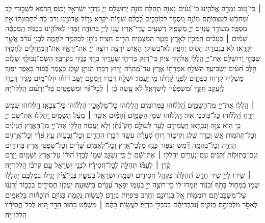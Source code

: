 \documentclass[twoside, openany, parskip=half, 11pt]{book}
\begin{document}
 ׀
כִּי־ט֭וֹב זַמְּרָ֣ה אֱלֹהֵ֑ינוּ כִּי־נָ֝עִ֗ים נָאוָ֥ה תְהִלָּֽה׃
בּוֹנֵ֣ה יְרֽוּשָׁלַ֣‍ִם יְיָ֑ נִדְחֵ֖י יִשְׂרָאֵ֣ל יְכַנֵּֽס׃
הָ֭רֹפֵא לִשְׁב֣וּרֵי לֵ֑ב וּ֝מְחַבֵּ֗שׁ לְעַצְּבוֹתָֽם׃
מוֹנֶ֣ה מִ֭סְפָּר לַכּוֹכָבִ֑ים לְ֝כֻלָּ֗ם שֵׁמ֥וֹת יִקְרָֽא׃
גָּד֣וֹל אֲדוֹנֵ֣ינוּ וְרַב־כֹּ֑חַ לִ֝תְבוּנָת֗וֹ אֵ֣ין מִסְפָּֽר׃
מְעוֹדֵ֣ד עֲנָוִ֣ים יְיָ֑ מַשְׁפִּ֖יל רְשָׁעִ֣ים עֲדֵי־אָֽרֶץ׃
עֱנ֣וּ לַֽייָ֣ בְּתוֹדָ֑ה זַמְּר֖וּ לֵאלֹהֵ֣ינוּ בְכִנּֽוֹר׃
הַֽמְכַסֶּ֬ה שָׁמַ֨יִם ׀ בְּעָבִ֗ים הַמֵּכִ֣ין לָאָ֣רֶץ מָטָ֑ר הַמַּצְמִ֖יחַ הָרִ֣ים חָצִֽיר׃
נוֹתֵ֣ן לִבְהֵמָ֣ה לַחְמָ֑הּ לִבְנֵ֥י עֹ֝רֵ֗ב אֲשֶׁ֣ר יִקְרָֽאוּ׃
לֹ֤א בִגְבוּרַ֣ת הַסּ֣וּס יֶחְפָּ֑ץ לֹא־בְשׁוֹקֵ֖י הָאִ֣ישׁ יִרְצֶֽה׃
רוֹצֶ֣ה יְיָ֭ אֶת־יְרֵאָ֑יו אֶת־הַֽמְיַחֲלִ֥ים לְחַסְדּֽוֹ׃
שַׁבְּחִ֣י יְ֭רוּשָׁלַ‍ִם אֶת־יְיָ֑ הַֽלְלִ֖י אֱלֹהַ֣יִךְ צִיּֽוֹן׃
כִּֽי־חִ֭זַּק בְּרִיחֵ֣י שְׁעָרָ֑יִךְ בֵּרַ֖ךְ בָּנַ֣יִךְ בְּקִרְבֵּֽךְ׃
הַשָּׂם־גְּבוּלֵ֥ךְ שָׁל֑וֹם חֵ֥לֶב חִ֝טִּ֗ים יַשְׂבִּיעֵֽךְ׃
הַשֹּׁלֵ֣חַ אִמְרָת֣וֹ אָ֑רֶץ עַד־מְ֝הֵרָ֗ה יָר֥וּץ דְּבָרֽוֹ׃
הַנֹּתֵ֣ן שֶׁ֣לֶג כַּצָּ֑מֶר כְּ֝פ֗וֹר כָּאֵ֥פֶר יְפַזֵּֽר׃
מַשְׁלִ֣יךְ קַֽרְח֣וֹ כְפִתִּ֑ים לִפְנֵ֥י קָ֝רָת֗וֹ מִ֣י יַעֲמֹֽד׃
יִשְׁלַ֣ח דְּבָר֣וֹ וְיַמְסֵ֑ם יַשֵּׁ֥ב ר֝וּח֗וֹ יִזְּלוּ־מָֽיִם׃
מַגִּ֣יד דְּבָרָ֣ו לְיַעֲקֹ֑ב חֻקָּ֥יו וּ֝מִשְׁפָּטָ֗יו לְיִשְׂרָאֵֽל׃
לֹ֘א עָ֤שָׂה כֵ֨ן ׀ לְכׇל־גּ֗וֹי וּמִשְׁפָּטִ֥ים בַּל־יְדָע֗וּם הַֽלְלוּ־יָֽהּ׃


 ׀
הַֽלְל֣וּ אֶת־יְיָ֭ מִן־הַשָּׁמַ֑יִם הַֽ֝לְל֗וּהוּ בַּמְּרוֹמִֽים׃
הַֽלְל֥וּהוּ כׇל־מַלְאָכָ֑יו הַ֝לְל֗וּהוּ כׇּל־צְבָאָֽו׃
הַֽ֭לְלוּהוּ שֶׁ֣מֶשׁ וְיָרֵ֑חַ הַֽ֝לְל֗וּהוּ כׇּל־כּ֥וֹכְבֵי אֽוֹר׃
הַֽ֭לְלוּהוּ שְׁמֵ֣י הַשָּׁמָ֑יִם וְ֝הַמַּ֗יִם אֲשֶׁ֤ר ׀ מֵעַ֬ל הַשָּׁמָֽיִם׃
יְֽ֭הַלְלוּ אֶת־שֵׁ֣ם יְיָ֑ כִּ֤י ה֖וּא צִוָּ֣ה וְנִבְרָֽאוּ׃
וַיַּעֲמִידֵ֣ם לָעַ֣ד לְעוֹלָ֑ם חׇק־נָ֝תַ֗ן וְלֹ֣א יַעֲבֽוֹר׃
הַֽלְל֣וּ אֶת־יְיָ֭ מִן־הָאָ֑רֶץ תַּ֝נִּינִ֗ים וְכׇל־תְּהֹמֽוֹת׃
אֵ֣שׁ וּ֭בָרָד שֶׁ֣לֶג וְקִיט֑וֹר ר֥וּחַ סְ֝עָרָ֗ה עֹשָׂ֥ה דְבָרֽוֹ׃
הֶהָרִ֥ים וְכׇל־גְּבָע֑וֹת עֵ֥ץ פְּ֝רִ֗י וְכׇל־אֲרָזִֽים׃
הַחַיָּ֥ה וְכׇל־בְּהֵמָ֑ה רֶ֗֝מֶשׂ וְצִפּ֥וֹר כָּנָֽף׃
מַלְכֵי־אֶ֭רֶץ וְכׇל־לְאֻמִּ֑ים שָׂ֝רִ֗ים וְכׇל־שֹׁ֥פְטֵי אָֽרֶץ׃
בַּחוּרִ֥ים וְגַם־בְּתוּל֑וֹת זְ֝קֵנִ֗ים עִם־נְעָרִֽים׃
יְהַלְל֤וּ ׀ אֶת־שֵׁ֬ם יְיָ֗ כִּֽי־נִשְׂגָּ֣ב שְׁמ֣וֹ לְבַדּ֑וֹ
ה֝וֹד֗וֹ עַל־אֶ֥רֶץ וְשָׁמָֽיִם׃ וַיָּ֤רֶם קֶ֨רֶן ׀ לְעַמּ֡וֹ תְּהִלָּ֤ה לְֽכׇל־חֲסִידָ֗יו
לִבְנֵ֣י יִ֭שְׂרָאֵל עַ֥ם קְרֹב֗וֹ הַֽלְלוּ־יָֽהּ׃\\
 ׀
שִׁ֣ירוּ לַֽייָ֭ שִׁ֣יר חָדָ֑שׁ תְּ֝הִלָּת֗וֹ בִּקְהַ֥ל חֲסִידִֽים׃
יִשְׂמַ֣ח יִשְׂרָאֵ֣ל בְּעֹשָׂ֑יו בְּנֵֽי־צִ֝יּ֗וֹן יָגִ֥ילוּ בְמַלְכָּֽם׃
יְהַלְל֣וּ שְׁמ֣וֹ בְמָח֑וֹל בְּתֹ֥ף וְ֝כִנּ֗וֹר יְזַמְּרוּ־לֽוֹ׃
כִּֽי־רוֹצֶ֣ה יְיָ֣ בְּעַמּ֑וֹ יְפָאֵ֥ר עֲ֝נָוִ֗ים בִּישׁוּעָֽה׃
יַעְלְז֣וּ חֲסִידִ֣ים בְּכָב֑וֹד יְ֝רַנְּנ֗וּ עַל־מִשְׁכְּבוֹתָֽם׃
רוֹמְמ֣וֹת אֵ֭ל בִּגְרוֹנָ֑ם וְחֶ֖רֶב פִּיפִיּ֣וֹת בְּיָדָֽם׃
לַעֲשׂ֣וֹת נְ֭קָמָה בַּגּוֹיִ֑ם תּ֝וֹכֵח֗וֹת בַּלְאֻמִּֽים׃
לֶאְסֹ֣ר מַלְכֵיהֶ֣ם בְּזִקִּ֑ים וְ֝נִכְבְּדֵיהֶ֗ם בְּכַבְלֵ֥י בַרְזֶֽל׃
לַעֲשׂ֤וֹת בָּהֶ֨ם ׀ מִשְׁפָּ֬ט כָּת֗וּב הָדָ֣ר ה֭וּא לְכׇל־חֲסִידָ֗יו הַֽלְלוּ־יָֽהּ׃
\end{document}
